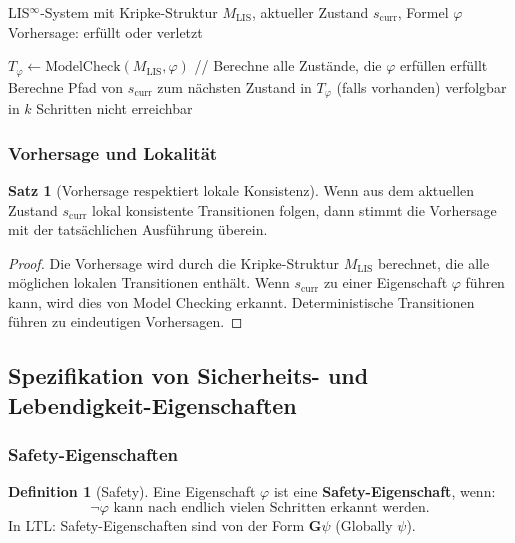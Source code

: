 \documentclass[a4paper,12pt]{article}
\theoremstyle{definition}
\newtheorem{definition}{Definition}
\newtheorem{satz}{Satz}
\begin{document}
\begin{algorithm}[H]
	\caption{Vorhersage-Algorithmus für LIS$^{\infty}$}
	\label{alg:vorhersage}
	\begin{algorithmic}[1]
		\Require LIS$^{\infty}$-System mit Kripke-Struktur $M_{\text{LIS}}$, aktueller Zustand $s_{\text{curr}}$, Formel $\varphi$
		\Ensure Vorhersage: erfüllt oder verletzt
		
		\State $T_{\varphi} \leftarrow \text{ModelCheck}(M_{\text{LIS}}, \varphi)$ \quad // Berechne alle Zustände, die $\varphi$ erfüllen
		\State \Return erfüllt
		\Else
		\State Berechne Pfad von $s_{\text{curr}}$ zum nächsten Zustand in $T_{\varphi}$ (falls vorhanden)
		\State \Return verfolgbar in $k$ Schritten
		\Else
		\State \Return nicht erreichbar
		\EndIf
		\EndIf
	\end{algorithmic}
\end{algorithm}

\subsubsection{Vorhersage und Lokalität}

\begin{satz}[Vorhersage respektiert lokale Konsistenz]
	\label{satz:vorhersage_lokalitaet}
	Wenn aus dem aktuellen Zustand $s_{\text{curr}}$ lokal konsistente Transitionen folgen, dann stimmt die Vorhersage mit der tatsächlichen Ausführung überein.
\end{satz}

\begin{proof}
	Die Vorhersage wird durch die Kripke-Struktur $M_{\text{LIS}}$ berechnet, die alle möglichen lokalen Transitionen enthält. Wenn $s_{\text{curr}}$ zu einer Eigenschaft $\varphi$ führen kann, wird dies von Model Checking erkannt. Deterministische Transitionen führen zu eindeutigen Vorhersagen.
\end{proof}

\subsection{Spezifikation von Sicherheits- und Lebendigkeit-Eigenschaften}

\subsubsection{Safety-Eigenschaften}

\begin{definition}[Safety]
	\label{def:safety}
	Eine Eigenschaft $\varphi$ ist eine \textbf{Safety-Eigenschaft}, wenn:
	\[
	\neg \varphi \text{ kann nach endlich vielen Schritten erkannt werden}.
	\]
	In LTL: Safety-Eigenschaften sind von der Form $\mathbf{G}\psi$ (Globally $\psi$).
\end{definition}
\end{document}
